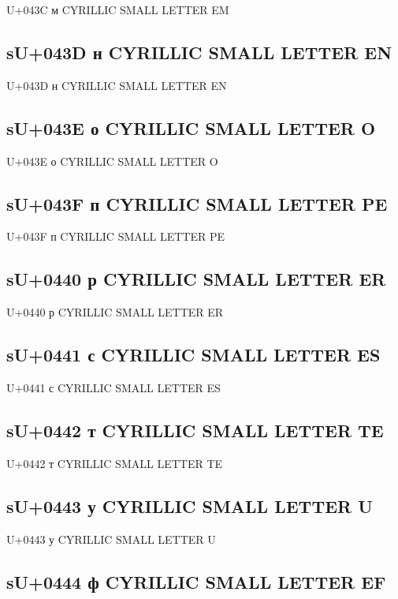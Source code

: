 U+043C м  CYRILLIC SMALL LETTER EM

\subsection{sU+043D н  CYRILLIC SMALL LETTER EN}

U+043D н  CYRILLIC SMALL LETTER EN

\subsection{sU+043E о  CYRILLIC SMALL LETTER O}

U+043E о  CYRILLIC SMALL LETTER O

\subsection{sU+043F п  CYRILLIC SMALL LETTER PE}

U+043F п  CYRILLIC SMALL LETTER PE

\subsection{sU+0440 р  CYRILLIC SMALL LETTER ER}

U+0440 р  CYRILLIC SMALL LETTER ER

\subsection{sU+0441 с  CYRILLIC SMALL LETTER ES}

U+0441 с  CYRILLIC SMALL LETTER ES

\subsection{sU+0442 т  CYRILLIC SMALL LETTER TE}

U+0442 т  CYRILLIC SMALL LETTER TE

\subsection{sU+0443 у  CYRILLIC SMALL LETTER U}

U+0443 у  CYRILLIC SMALL LETTER U

\subsection{sU+0444 ф  CYRILLIC SMALL LETTER EF}

